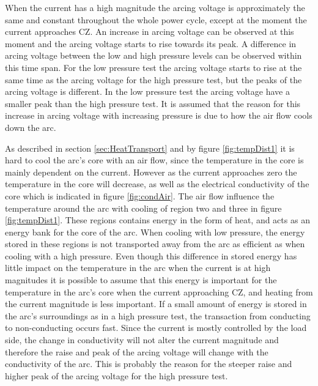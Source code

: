 \documentclass[10pt,a4paper,twoside]{article}
\begin{document}
When the current has a high magnitude the arcing voltage is approximately the same and constant throughout the whole power cycle, except at the moment the current approaches CZ. An increase in arcing voltage can be observed at this moment and the arcing voltage starts to rise towards its peak. A difference in arcing voltage between the low and high pressure levels can be observed within this time span. For the low pressure test the arcing voltage starts to rise at the same time as the arcing voltage for the high pressure test, but the peaks of the arcing voltage is different. In the low pressure test the arcing voltage have a smaller peak than the high pressure test. It is assumed that the reason for this increase in arcing voltage with increasing pressure is due to how the air flow cools down the arc.

As described in section \ref{sec:HeatTransport} and by figure \ref{fig:tempDist1} it is hard to cool the arc's core with an air flow, since the temperature in the core is mainly dependent on the current. However as the current approaches zero the temperature in the core will decrease, as well as the electrical conductivity of the core which is indicated in figure \ref{fig:condAir}. The air flow influence the temperature around the arc with cooling of region two and three in figure \ref{fig:tempDist1}. These regions contains energy in the form of heat, and acts as an energy bank for the core of the arc. When cooling with low pressure, the energy stored in these regions is not transported away from the arc as efficient as when cooling with a high pressure. Even though this difference in stored energy has little impact on the temperature in the arc when the current is at high magnitudes it is possible to assume that this energy is important for the temperature in the arc's core when the current approaching CZ, and heating from the current magnitude is less important. If a small amount of energy is stored in the arc's surroundings as in a high pressure test, the transaction from conducting to non-conducting occurs fast. Since the current is mostly controlled by the load side, the change in conductivity will not alter the current magnitude and therefore the raise and peak of the arcing voltage will change with the conductivity of the arc. This is probably the reason for the steeper raise and higher peak of the arcing voltage for the high pressure test.
\end{document}
